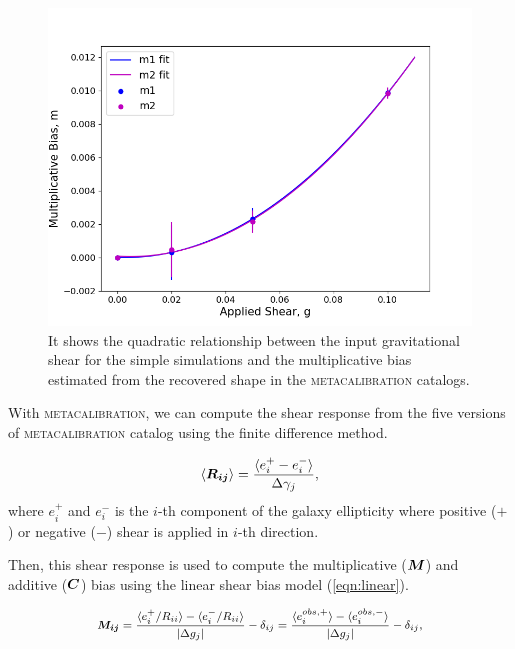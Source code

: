 {\begin{figure}
	\includegraphics[width=\columnwidth]{metacal_bias_shear.png}
    \vspace*{-5mm}
    \caption{It shows the quadratic relationship between the input gravitational shear for the simple simulations and the multiplicative bias estimated from the recovered shape in the \textsc{metacalibration} catalogs. }
    \label{fig:metacal_shear_linear}
\end{figure}


With \textsc{metacalibration}, we can compute the shear response from the five versions of \textsc{metacalibration} catalog using the finite difference method. 


\begin{equation}
    \langle\vb*{R_{ij}}\rangle = 
    \frac{\langle e^{+}_{i} - e^{-}_{i} \rangle}{\Delta\gamma_{j}}, 
\end{equation}
where $e^{+}_{i}$ and $e^{-}_{i}$ is the $i$-th component of the galaxy ellipticity where positive ($+$) or negative ($-$) shear is applied in $i$-th direction. 


Then, this shear response is used to compute the multiplicative ($\vb*{M}$) and additive ($\vb*{C}$) bias using the linear shear bias model (\ref{eqn:linear}). 


\begin{equation}
    \small
    \vb*{M_{ij}} = 
    \frac{\langle e^{+}_{i}/R_{ii} \rangle - \langle e^{-}_{i}/R_{ii} \rangle}{\abs{\Delta g_{j}}} - \delta_{ij} 
    = \frac{\langle e^{obs,+}_{i}\rangle - \langle e^{obs,-}_{i}\rangle}{\abs{\Delta g_{j}}} - \delta_{ij}, 
\end{equation}


}
